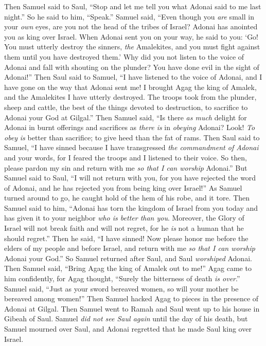 \begin{biblechapter}
\verse Then Samuel said to Saul, “Stop and let me tell you what Adonai said to me last night.” So he said to him, “Speak.”
\verse Samuel said, “Even though you \textit{are} small in your \textit{own} eyes, are you not the head of the tribes of Israel? Adonai has anointed you as king over Israel.
\verse When Adonai sent you on your way, he said to you: ‘Go! You must utterly destroy the sinners, \textit{the} Amalekites, and you must fight against them until you have destroyed them.’
\verse Why did you not listen to the voice of Adonai and fall with shouting on the plunder? You have done evil in the sight of Adonai!”
\verse Then Saul said to Samuel, “I have listened to the voice of Adonai, and I have gone on the way that Adonai sent me! I brought Agag the king of Amalek, and the Amalekites I have utterly destroyed.
\verse The troops took from the plunder, sheep and cattle, the best of the things devoted to destruction, to sacrifice to Adonai your God at Gilgal.”
\verse Then Samuel said,
\verse “Is there \textit{as much} delight for Adonai in burnt offerings and sacrifices 
as \textit{there is} in \textit{obeying} Adonai? 
Look! \textit{To obey} \textit{is} better than sacrifice; 
to give heed than the fat of rams.
\verse Then Saul said to Samuel, “I have sinned because I have transgressed \textit{the commandment of Adonai} and your words, for I feared the troops and I listened to their voice.
\verse So then, please pardon my sin and return with me \textit{so that I can worship} Adonai.”
\verse But Samuel said to Saul, “I will not return with you, for you have rejected the word of Adonai, and he has rejected you from being king over Israel!”
\verse As Samuel turned around to go, he caught hold of the hem of his robe, and it tore.
\verse Then Samuel said to him, “Adonai has torn the kingdom of Israel from you today and has given it to your neighbor \textit{who is better than you}.
\verse Moreover, the Glory of Israel will not break faith and will not regret, for he \textit{is} not a human that he should regret.”
\verse Then he said, “I have sinned! Now please honor me before the elders of my people and before Israel, and return with me \textit{so that I can worship} Adonai your God.”
\verse So Samuel returned after Saul, and Saul \textit{worshiped} Adonai.
\verse Then Samuel said, “Bring Agag the king of Amalek out to me!” Agag came to him confidently, for Agag thought, “Surely the bitterness of death \textit{is over}.”
\verse Samuel said, “Just as your sword bereaved women, 
so will your mother be bereaved among women!” Then Samuel hacked Agag to pieces in the presence of Adonai at Gilgal.
\verse Then Samuel went to Ramah and Saul went up to his house in Gibeah of Saul.
\verse Samuel \textit{did not see Saul again} until the day of his death, but Samuel mourned over Saul, and Adonai regretted that he made Saul king over Israel.
\end{biblechapter}

